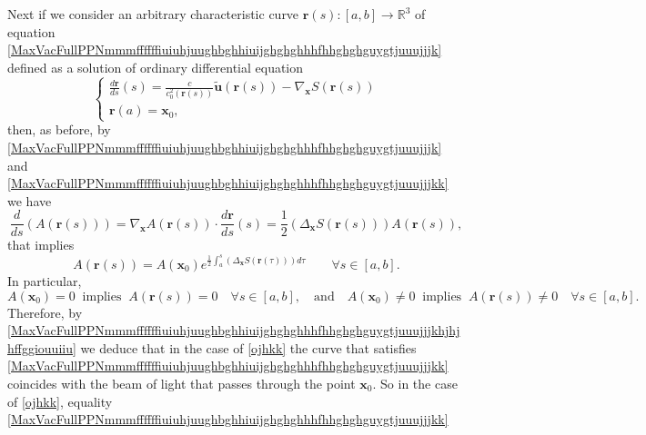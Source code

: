 \documentclass{article}
\theoremstyle{definition}
\theoremstyle{remark}
\renewcommand{\vec}[1]{\mathbf{#1}}
\newcommand{\er}{\eqref}
\newcommand{\er}{\eqref}
\begin{document}
Next if we consider an arbitrary characteristic curve $\vec
r(s):[a,b]\to\mathbb{R}^3$ of equation
\er{MaxVacFullPPNmmmffffffiuiuhjuughbghhiuijghghghhhfhhghghguygtjuuujjjk}
defined as a solution of ordinary differential equation
\begin{equation}\label{MaxVacFullPPNmmmffffffiuiuhjuughbghhiuijghghghhhfhhghghguygtjuuujjjkk}
\begin{cases}
\frac{d\vec r}{ds}(s)=\frac{c}{c^2_0\left(\vec r(s)\right)}\vec
{\tilde u}\left(\vec
r(s)\right)-\nabla_{\vec x}S\left(\vec r(s)\right)\\
\vec r(a)=\vec x_0,
\end{cases}
\end{equation}
then, as before, by
\er{MaxVacFullPPNmmmffffffiuiuhjuughbghhiuijghghghhhfhhghghguygtjuuujjjk}
and
\er{MaxVacFullPPNmmmffffffiuiuhjuughbghhiuijghghghhhfhhghghguygtjuuujjjkk}
we have
\begin{equation}\label{MaxVacFullPPNmmmffffffiuiuhjuughbghhiuijghghghhhfhhghghguygtjuuujjjkhjhjh}
\frac{d}{ds}\left(A\left(\vec r(s)\right)\right)=\nabla_{\vec
x}A\left(\vec r(s)\right)\cdot\frac{d\vec
r}{ds}(s)=\frac{1}{2}\left(\Delta_{\vec x}S\left(\vec
r(s)\right)\right)A\left(\vec r(s)\right),
\end{equation}
that implies
\begin{equation}\label{MaxVacFullPPNmmmffffffiuiuhjuughbghhiuijghghghhhfhhghghguygtjuuujjjkhjhjhffgg}
A\left(\vec r(s)\right)=A\left(\vec
x_0\right)e^{\frac{1}{2}\int_a^{s}\left(\Delta_{\vec x}S\left(\vec
r(\tau)\right)\right)d\tau}\quad\quad\forall s\in[a,b].
\end{equation}
In particular,
\begin{equation}\label{MaxVacFullPPNmmmffffffiuiuhjuughbghhiuijghghghhhfhhghghguygtjuuujjjkhjhjhffggiouuiiu}
A\left(\vec x_0\right)=0\;\;\text{implies}\;\; A\left(\vec
r(s)\right)=0\quad\forall s\in[a,b],\quad\text{and}\quad A\left(\vec
x_0\right)\neq 0\;\;\text{implies}\;\; A\left(\vec r(s)\right)\neq
0\quad\forall s\in[a,b].
\end{equation}
Therefore, by
\er{MaxVacFullPPNmmmffffffiuiuhjuughbghhiuijghghghhhfhhghghguygtjuuujjjkhjhjhffggiouuiiu}
we deduce that in the case of \er{ojhkk} the curve that satisfies
\er{MaxVacFullPPNmmmffffffiuiuhjuughbghhiuijghghghhhfhhghghguygtjuuujjjkk}
coincides with the beam of light that passes through the point $\vec
x_0$. So in the case of \er{ojhkk}, equality
\er{MaxVacFullPPNmmmffffffiuiuhjuughbghhiuijghghghhhfhhghghguygtjuuujjjkk}
\end{document}
